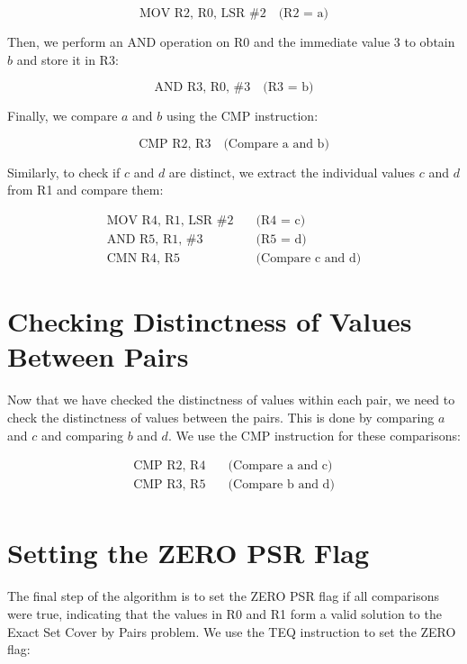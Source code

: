\begin{equation*}
\text{MOV R2, R0, LSR \#2} \quad \text{(R2 = a)}
\end{equation*}

Then, we perform an AND operation on R0 and the immediate value 3 to obtain $b$ and store it in R3:

\begin{equation*}
\text{AND R3, R0, \#3} \quad \text{(R3 = b)}
\end{equation*}

Finally, we compare $a$ and $b$ using the CMP instruction:

\begin{equation*}
\text{CMP R2, R3} \quad \text{(Compare a and b)}
\end{equation*}

Similarly, to check if $c$ and $d$ are distinct, we extract the individual values $c$ and $d$ from R1 and compare them:

\begin{align*}
\text{MOV R4, R1, LSR \#2} \quad &\text{(R4 = c)} \\
\text{AND R5, R1, \#3} \quad &\text{(R5 = d)} \\
\text{CMN R4, R5} \quad &\text{(Compare c and d)}
\end{align*}

\section{Checking Distinctness of Values Between Pairs}

Now that we have checked the distinctness of values within each pair, we need to check the distinctness of values between the pairs. This is done by comparing $a$ and $c$ and comparing $b$ and $d$. We use the CMP instruction for these comparisons:

\begin{align*}
\text{CMP R2, R4} \quad &\text{(Compare a and c)} \\
\text{CMP R3, R5} \quad &\text{(Compare b and d)} \\
\end{align*}

\section{Setting the ZERO PSR Flag}

The final step of the algorithm is to set the ZERO PSR flag if all comparisons were true, indicating that the values in R0 and R1 form a valid solution to the Exact Set Cover by Pairs problem. We use the TEQ instruction to set the ZERO flag:

